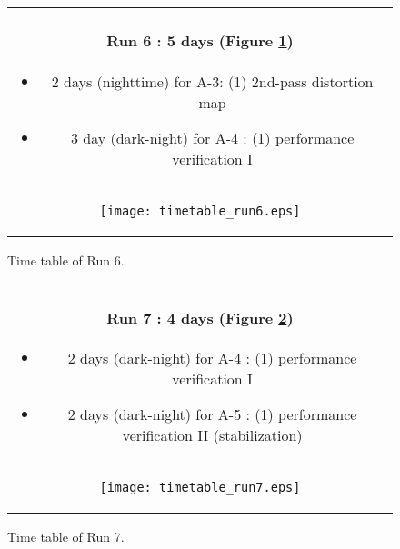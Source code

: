 \begin{figure}[!ht]
\begin{center}
\begin{tabular}{c}
\begin{minipage}{0.95\hsize}
\paragraph{Run 6 : 5 days  (Figure \ref{fig:run6})}
	\begin{itemize}
	\item 2 days (nighttime) for A-3:
	(1) 2nd-pass distortion map
	\item 3 day (dark-night) for A-4 :
	(1) performance verification I
	\end{itemize}
\end{minipage} \\
\begin{minipage}{0.8\hsize}
	\begin{center}
	\vspace*{5mm}
	\texttt{[image: timetable\_run6.eps]}
	\end{center}
	\vspace*{-5mm}
	\caption{Time table of Run 6.}
	\label{fig:run6}
\end{minipage}
\end{tabular}
\end{center}
\end{figure}

\begin{figure}[!ht]
\begin{center}
\begin{tabular}{c}
\begin{minipage}{0.95\hsize}
\paragraph{Run 7 : 4 days  (Figure \ref{fig:run7})}
	\begin{itemize}
	\item 2 days (dark-night) for A-4 : 
	(1) performance verification I
	\item 2 days (dark-night) for A-5 :
	(1) performance verification II (stabilization)
	\end{itemize}
\end{minipage} \\
\begin{minipage}{0.8\hsize}
	\begin{center}
	\vspace*{5mm}
	\texttt{[image: timetable\_run7.eps]}
	\end{center}
	\vspace*{-5mm}
	\caption{Time table of Run 7.}
	\label{fig:run7}
\end{minipage}
\end{tabular}
\end{center}
\end{figure}

